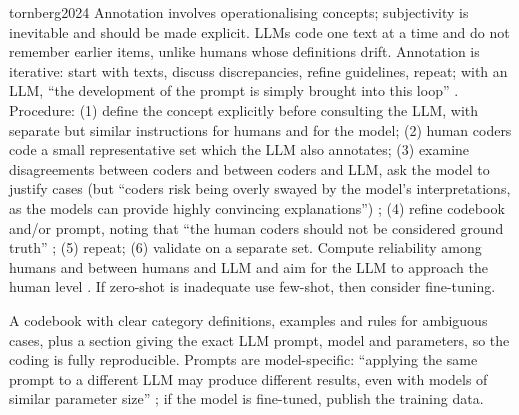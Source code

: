\begin{papercard}{tornberg2024}
 Annotation involves operationalising concepts; subjectivity is inevitable and should be made explicit. LLMs code one text at a time and do not remember earlier items, unlike humans whose definitions drift. Annotation is iterative: start with texts, discuss discrepancies, refine guidelines, repeat; with an LLM, ``the development of the prompt is simply brought into this loop'' . Procedure: (1) define the concept explicitly before consulting the LLM, with separate but similar instructions for humans and for the model; (2) human coders code a small representative set which the LLM also annotates; (3) examine disagreements between coders and between coders and LLM, ask the model to justify cases (but ``coders risk being overly swayed by the model's interpretations, as the models can provide highly convincing explanations'') ; (4) refine codebook and/or prompt, noting that ``the human coders should not be considered ground truth'' ; (5) repeat; (6) validate on a separate set. Compute reliability among humans and between humans and LLM and aim for the LLM to approach the human level . If zero-shot is inadequate use few-shot, then consider fine-tuning.

 A codebook with clear category definitions, examples and rules for ambiguous cases, plus a section giving the exact LLM prompt, model and parameters, so the coding is fully reproducible. Prompts are model-specific: ``applying the same prompt to a different LLM may produce different results, even with models of similar parameter size'' ; if the model is fine-tuned, publish the training data.


\end{papercard}
